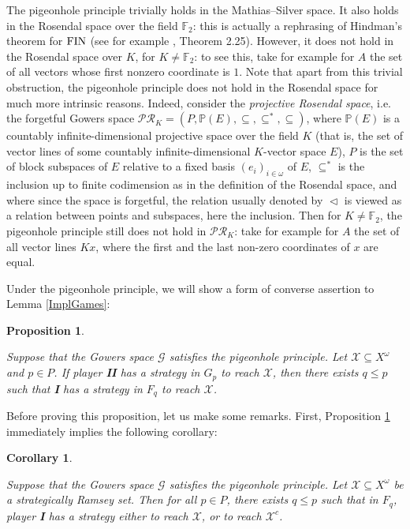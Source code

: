 \documentclass[a4paper,11pt]{article}
\newtheorem{cor}[thm]{Corollary}
\newtheorem{prop}[thm]{Proposition}
\theoremstyle{definition}
\numberwithin{equation}{section}
\newcommand{\X}{\mathcal{X}}
\newcommand{\G}{\mathcal{G}}
\newcommand{\I}{\textbf{I}}
\newcommand{\II}{\textbf{II}}
\begin{document}
The pigeonhole principle trivially holds in the Mathias--Silver space. It also holds in the Rosendal space over the field $\mathbb{F}_2$: this is actually a rephrasing of Hindman's theorem for $\textup{FIN}$ (see for example \cite{todorcevicorange}, Theorem 2.25). However, it does not hold in the Rosendal space over $K$, for $K \neq \mathbb{F}_2$: to see this, take for example for $A$ the set of all vectors whose first nonzero coordinate is $1$. Note that apart from this trivial obstruction, the pigeonhole principle does not hold in the Rosendal space for much more intrinsic reasons. Indeed, consider the \emph{projective Rosendal space}, i.e. the forgetful Gowers space $\mathcal{PR}_K = (P, \mathbb{P}(E), \subseteq, \subseteq^*, \subseteq)$, where $\mathbb{P}(E)$ is a countably infinite-dimensional projective space over the field $K$ (that is, the set of vector lines of some countably infinite-dimensional $K$-vector space $E$), $P$ is the set of block subspaces of $E$ relative to a fixed basis $(e_i)_{i \in \omega}$ of $E$, $\subseteq^*$ is the inclusion up to finite codimension as in the definition of the Rosendal space, and where since the space is forgetful, the relation usually denoted by $\vartriangleleft$ is viewed as a relation between points and subspaces, here the inclusion. Then for $K \neq \mathbb{F}_2$, the pigeonhole principle still does not hold in $\mathcal{PR}_K$: take for example for $A$ the set of all vector lines $Kx$, where the first and the last non-zero coordinates of $x$ are equal.

\smallskip

Under the pigeonhole principle, we will show a form of converse assertion to Lemma \ref{ImplGames}:

\begin{prop}\label{consPigeonhole}

Suppose that the Gowers space $\G$ satisfies the pigeonhole principle. Let $\X \subseteq X^\omega$ and $p \in P$. If player \II{} has a strategy in $G_p$ to reach $\X$, then there exists $q \leqslant p$ such that \I{} has a strategy in $F_q$ to reach $\X$.

\end{prop}

Before proving this proposition, let us make some remarks. First, Proposition \ref{consPigeonhole} immediately implies the following corollary:

\begin{cor}\label{strongStratRamsey}

Suppose that the Gowers space $\G$ satisfies the pigeonhole principle. Let $\X \subseteq X^\omega$ be a strategically Ramsey set. Then for all $p \in P$, there exists $q \leqslant p$ such that in $F_q$, player \I{} has a strategy either to reach $\X$, or to reach $\X^c$.

\end{cor}
\end{document}
